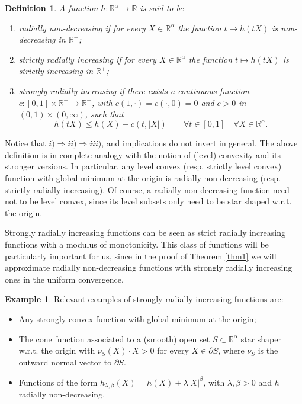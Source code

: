 \documentclass[a4paper,11pt]{article}
\numberwithin{equation}{section}
\newtheorem{Definition}[Theorem]{Definition}
\newcommand{\numberset}{\mathbb}
\newcommand{\R}{\numberset{R}}
\theoremstyle{definition}
\newtheorem{Example}[Theorem]{Example}
\begin{document}
\begin{Definition}
\indent
A function $h:\R^\alpha\to\R$ is said to be
\begin{enumerate}
\item[i)] radially non-decreasing if for every $X\in\R^\alpha$ the function $t\mapsto h(tX)$ is non-decreasing in $\R^+$;
\item[ii)] strictly radially increasing if for every $X\in\R^\alpha$ the function $t\mapsto h(tX)$ is strictly increasing in $\R^+$;
\item[iii)] strongly radially increasing if there exists a continuous function $c:[0,1]\times\R^+\to\R^+$, with $c(1,\cdot)=c(\cdot,0)=0$ and $c>0$ in $(0,1)\times(0,\infty)$, such that
$$
h(tX)\leq h(X)-c(t,|X|)\qquad\forall t\in[0,1]\quad\forall X\in\R^\alpha.
$$ 
\end{enumerate}
\end{Definition}
Notice that $i)\Rightarrow ii)\Rightarrow iii)$, and implications do not invert in general.
The above definition is in complete analogy with the notion of (level) convexity and its stronger versions. In particular, any  level convex (resp. strictly level convex) function with global minimum at the origin is radially non-decreasing (resp. strictly radially increasing). Of course, a radially non-decreasing function need not to be level convex, since its level subsets only need to be star shaped w.r.t. the origin.

Strongly radially increasing functions can be seen as strict radially increasing functions with a modulus of monotonicity. This class of functions will be particularly important for us, since in the proof of Theorem \ref{thm1} we will approximate radially non-decreasing functions with strongly radially increasing ones in the uniform convergence.


\begin{Example}\label{Ex}
Relevant examples of strongly radially increasing functions are:
\begin{itemize}
\item Any strongly convex function with global minimum at the origin;
\item The cone function associated to a (smooth) open set $S\subset\R^\alpha$ star shaper w.r.t. the origin with $\nu_{S}(X)\cdot X>0$ for every $X\in\partial S$, where $\nu_S$ is the outward normal vector to $\partial S$.
\item Functions of the form $h_{\lambda,\beta}(X)=h(X)+\lambda|X|^\beta$, with $\lambda,\beta>0$ and $h$ radially non-decreasing. 
\end{itemize}
\end{Example}
\end{document}

